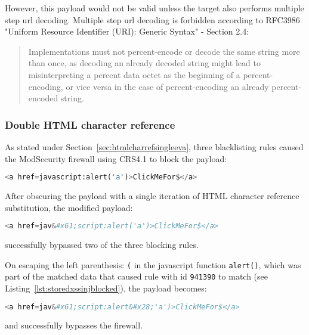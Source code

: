 However, this payload would not be valid unless the target also performs multiple step url decoding. Multiple step url decoding is forbidden according to RFC3986 "Uniform Resource Identifier (URI): Generic Syntax" - Section 2.4:
\begin{quote}
	Implementations must not
	percent-encode or decode the same string more than once, as decoding
	an already decoded string might lead to misinterpreting a percent
	data octet as the beginning of a percent-encoding, or vice versa in
	the case of percent-encoding an already percent-encoded string.
\end{quote}

\subsubsection{Double HTML character reference}
\label{sec:doublehtmlcharref}
As stated under Section~\ref{sec:htmlcharrefsingleeva}, three blacklisting rules caused the ModSecurity firewall using CRS4.1 to block the payload:

\begin{lstlisting}[style=basicStyle, language=Python]
<a href=javascript:alert('a')>ClickMeFor$</a>
\end{lstlisting}

After obscuring the payload with a single iteration of HTML character reference substitution, the modified payload:

\begin{lstlisting}[style=basicStyle, language=Python]
<a href=jav&#x61;script:alert('a')>ClickMeFor$</a>
\end{lstlisting}

successfully bypassed two of the three blocking rules.

On escaping the left parenthesis: \verb|(| in the javascript function \verb|alert()|, which was part of the matched data that caused rule with id \verb|941390| to match (see Listing~\ref{lst:storedxssinjblocked}), the payload becomes:

\begin{lstlisting}[style=basicStyle, language=Python, caption=HTML character reference bypass, label={lst:htmlcharacterreferencebypass}]
<a href=jav&#x61;script:alert&#x28;'a')>ClickMeFor$</a>
\end{lstlisting}

and successfully bypasses the firewall.


